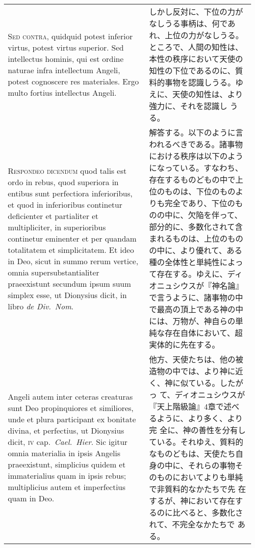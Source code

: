 \documentclass[10pt]{jsarticle} %
\begin{document}
\begin{longtable}{p{21em}p{21em}}
\\


{\scshape  Sed contra}, quidquid potest inferior virtus,
potest virtus superior. Sed intellectus hominis, qui est ordine naturae
infra intellectum Angeli, potest cognoscere res materiales. Ergo multo
fortius intellectus Angeli.


&

しかし反対に、下位の力がなしうる事柄は、何であれ、上位の力がなしうる。
ところで、人間の知性は、本性の秩序において天使の知性の下位であるのに、質
 料的事物を認識しうる。ゆえに、天使の知性は、より強力に、それを認識し
 うる。


\\


{\scshape Respondeo dicendum} quod talis est ordo in
rebus, quod superiora in entibus sunt perfectiora inferioribus, et quod
in inferioribus continetur deficienter et partialiter et multipliciter,
in superioribus continetur eminenter et per quandam totalitatem et
simplicitatem. Et ideo in Deo, sicut in summo rerum vertice, omnia
supersubstantialiter praeexistunt secundum ipsum suum simplex esse, ut
Dionysius dicit, in libro {\itshape de Div.~Nom}. 


&

解答する。以下のように言われるべきである。諸事物における秩序は以下のよう
になっている。すなわち、存在するものどもの中で上位のものは、下位のものよ
りも完全であり、下位のものの中に、欠陥を伴って、部分的に、多数化されて含
まれるものは、上位のものの中に、より優れて、ある種の全体性と単純性によっ
て存在する。ゆえに、ディオニュシウスが『神名論』で言うように、諸事物の中
で最高の頂上である神の中には、万物が、神自らの単純な存在自体において、超
実体的に先在する。

\\


Angeli autem inter ceteras
creaturas sunt Deo propinquiores et similiores, unde et plura
participant ex bonitate divina, et perfectius, ut Dionysius dicit, {\scshape iv}
cap.~{\itshape Cael.~Hier}. Sic igitur omnia materialia in ipsis Angelis
praeexistunt, simplicius quidem et immaterialius quam in ipsis rebus;
multiplicius autem et imperfectius quam in Deo. 

&

他方、天使たちは、他の被造物の中では、より神に近く、神に似ている。したがっ
 て、ディオニュシウスが『天上階級論』4章で述べるように、より多く、より完
 全に、神の善性を分有している。それゆえ、質料的なものどもは、天使たち自
 身の中に、それらの事物そのものにおいてよりも単純で非質料的なかたちで先
 在するが、神において存在するのに比べると、多数化されて、不完全なかたちで
ある。



\end{longtable}
\end{document}
